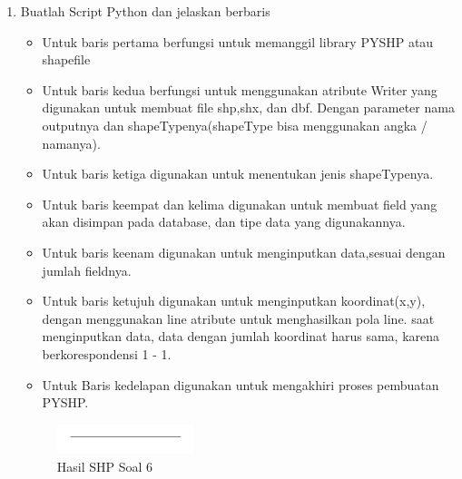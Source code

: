 \begin{enumerate}
	\item Buatlah Script Python dan jelaskan berbaris
	
	\begin{itemize}
		\item Untuk baris pertama berfungsi untuk memanggil library PYSHP atau shapefile
		\item Untuk baris kedua berfungsi untuk menggunakan atribute Writer yang digunakan untuk membuat file shp,shx, dan dbf. \hfill\break Dengan parameter nama outputnya dan shapeTypenya(shapeType bisa menggunakan angka / namanya).
		\item Untuk baris ketiga digunakan untuk menentukan jenis shapeTypenya.
		\item Untuk baris keempat dan kelima digunakan untuk membuat field yang akan disimpan pada database, dan tipe data yang digunakannya.
		\item Untuk baris keenam digunakan untuk menginputkan data,sesuai dengan jumlah fieldnya.
		\item Untuk baris ketujuh digunakan untuk menginputkan koordinat(x,y), dengan menggunakan line atribute untuk menghasilkan pola line. \hfill\break
		saat menginputkan data, data dengan jumlah koordinat harus sama, karena berkorespondensi 1 - 1.
		\item Untuk Baris kedelapan digunakan untuk mengakhiri proses pembuatan PYSHP.
	\end{itemize}
	\hfill\break
	\begin{figure}[H]
		\includegraphics[width=4cm]{figures/1174004/2/6.png}
		\centering
		\caption{Hasil SHP Soal 6}
	\end{figure}


\end{enumerate}
